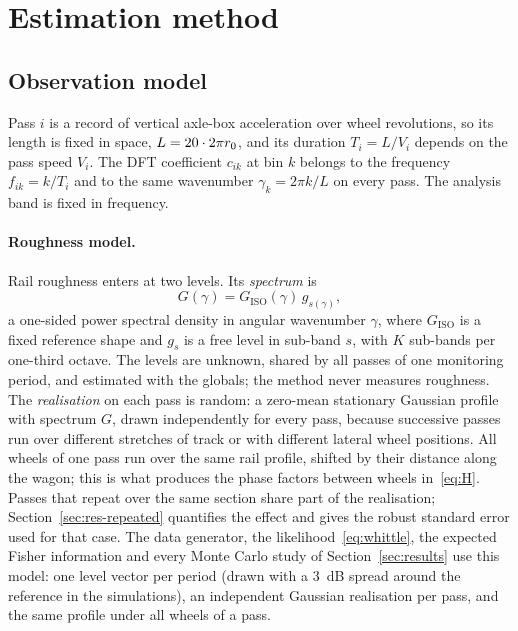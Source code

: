 \section{Estimation method}\label{sec:method}

\subsection{Observation model}\label{sec:obs}
Pass $i$ is a record of vertical axle-box acceleration over \NumRevs{} wheel revolutions, so its
length is fixed in space, $L = 20\cdot 2\pi r_0$, and its duration $T_i = L/V_i$ depends on the
pass speed $V_i$. The DFT coefficient $c_{ik}$ at bin $k$ belongs to the frequency $f_{ik} = k/T_i$
and to the same wavenumber $\gamma_k = 2\pi k/L$ on every pass. The analysis band is fixed in
frequency.

\paragraph{Roughness model.} Rail roughness enters at two levels. Its \emph{spectrum} is
\begin{equation}
  G(\gamma) = G_\mathrm{ISO}(\gamma)\,g_{s(\gamma)},
\end{equation}
a one-sided power spectral density in angular wavenumber $\gamma$, where $G_\mathrm{ISO}$ is a fixed
reference shape and $g_s$ is a free level in sub-band $s$, with $K$ sub-bands per one-third octave. The
levels are unknown, shared by all passes of one monitoring period, and estimated with the globals; the
method never measures roughness. The \emph{realisation} on each pass is random: a zero-mean
stationary Gaussian profile with spectrum $G$, drawn independently for every pass, because successive
passes run over different stretches of track or with different lateral wheel positions. All wheels of
one pass run over the same rail profile, shifted by their distance along the wagon; this is what produces
the phase factors between wheels in~\eqref{eq:H}. Passes that repeat over the same section share part
of the realisation; Section~\ref{sec:res-repeated} quantifies the effect and gives the robust standard
error used for that case. The data generator, the likelihood~\eqref{eq:whittle}, the expected Fisher
information and every Monte Carlo study of Section~\ref{sec:results} use this model: one level vector
per period (drawn with a 3~dB spread around the reference in the simulations), an independent Gaussian
realisation per pass, and the same profile under all wheels of a pass.

